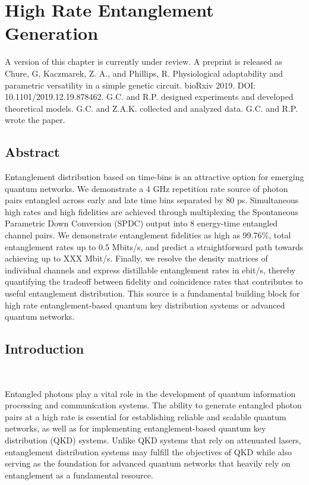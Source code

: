 \documentclass[11pt]{caltech_thesis} %
\begin{document}
\hypertarget{high-rate-entanglement-generation}{%
\chapter{High Rate Entanglement
Generation}\label{high-rate-entanglement-generation}}

A version of this chapter is currently under review. A preprint is
released as Chure, G, Kaczmarek, Z. A., and Phillips, R. Physiological
adaptability and parametric versatility in a simple genetic circuit.
bioRxiv 2019. DOI: 10.1101/2019.12.19.878462. G.C. and R.P. designed
experiments and developed theoretical models. G.C. and Z.A.K. collected
and analyzed data. G.C. and R.P. wrote the paper.

\hypertarget{abstract-3}{%
\section{Abstract}\label{abstract-3}}

Entanglement distribution based on time-bins is an attractive option for
emerging quantum networks. We demonstrate a 4 GHz repetition rate source
of photon pairs entangled across early and late time bins separated by
80 ps. Simultaneous high rates and high fidelities are achieved through
multiplexing the Spontaneous Parametric Down Conversion (SPDC) output
into 8 energy-time entangled channel pairs. We demonstrate entanglement
fidelities as high as 99.76\%, total entanglement rates up to 0.5
Mbits/s, and predict a straightforward path towards achieving up to
{\color{darkred} XXX} Mbit/s. Finally, we resolve the density matrices
of individual channels and express distillable entanglement rates in
ebit/s, thereby quantifying the tradeoff between fidelity and
coincidence rates that contributes to useful entanglement distribution.
This source is a fundamental building block for high rate
entanglement-based quantum key distribution systems or advanced quantum
networks.

\hypertarget{introduction-3}{%
\section{Introduction}\label{introduction-3}}

~~~~~

Entangled photons play a vital role in the development of quantum
information processing and communication systems. The ability to
generate entangled photon pairs at a high rate is essential for
establishing reliable and scalable quantum networks, as well as for
implementing entanglement-based quantum key distribution (QKD) systems.
Unlike QKD systems that rely on attenuated lasers, entanglement
distribution systems may fulfill the objectives of QKD while also
serving as the foundation for advanced quantum networks that heavily
rely on entanglement as a fundamental resource.
\end{document}
